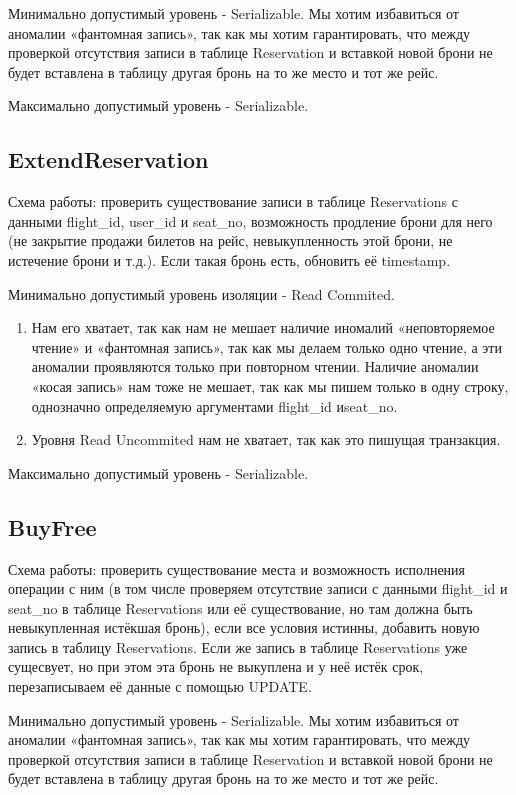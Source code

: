 \documentclass{article}
\begin{document}
Минимально допустимый уровень - Serializable. Мы хотим избавиться от аномалии «фантомная запись», так как мы хотим гарантировать, что между проверкой отсутствия записи в таблице Reservation и вставкой новой брони не будет вставлена в таблицу другая бронь на то же место и тот же рейс.

Максимально допустимый уровень - Serializable.

\subsection{ExtendReservation}

Схема работы: проверить существование записи в таблице Reservations с данными flight\_id, user\_id и seat\_no, возможность продление брони для него (не закрытие продажи билетов на рейс, невыкупленность этой брони, не истечение брони и т.д.). Если такая бронь есть, обновить её timestamp.
 
Минимально допустимый уровень изоляции - Read Commited.
\begin{enumerate}
\item Нам его хватает, так как нам не мешает наличие иномалий «неповторяемое чтение» и «фантомная запись», так как мы делаем только одно чтение, а эти аномалии проявляются только при повторном чтении. Наличие аномалии «косая запись» нам тоже не мешает, так как мы пишем только в одну строку, однозначно определяемую аргументами flight\_id иseat\_no.

\item Уровня Read Uncommited нам не хватает, так как это пишущая транзакция.
\end{enumerate}

Максимально допустимый уровень - Serializable.

\subsection{BuyFree}
Схема работы: проверить существование места и возможность исполнения операции с ним (в том числе проверяем отсутствие записи с данными flight\_id и seat\_no в таблице Reservations или её существование, но там должна быть невыкупленная истёкшая бронь), если все условия истинны, добавить новую запись в таблицу Reservations. Если же запись в таблице Reservations уже сущесвует, но при этом эта бронь не выкуплена и у неё истёк срок, перезаписываем её данные с помощью UPDATE.

Минимально допустимый уровень - Serializable. Мы хотим избавиться от аномалии «фантомная запись», так как мы хотим гарантировать, что между проверкой отсутствия записи в таблице Reservation и вставкой новой брони не будет вставлена в таблицу другая бронь на то же место и тот же рейс.
\end{document}
